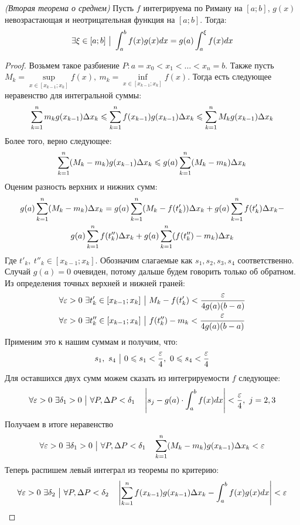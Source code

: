 \begin{theorem} \textit{(Вторая теорема о среднем)}
	Пусть $f$ интегрируема по Риману на $[a;b]$, $g(x)$ невозрастающая и неотрицательная функция на $[a;b]$. Тогда:
	\[
		\exists \xi \in [a;b] \ \big|\  \int_a^bf(x)g(x)dx = g(a)\int_a^\xi f(x)dx
	\]
\end{theorem}


\begin{proof}
	Возьмем такое разбиение $P : a = x_0 < x_1 < \ldots < x_n = b$. Также пусть $M_k = \sup\limits_{x \in [x_{k - 1};x_k]} f(x),\ m_k = \inf\limits_{x \in [x_{k - 1};x_k]} f(x)$. Тогда есть следующее неравенство для интегральной суммы:
	\[
	 	\sum\limits_{k = 1}^nm_kg(x_{k - 1})\Delta x_k \leqslant	\sum\limits_{k = 1}^nf(x_{k - 1})g(x_{k - 1})\Delta x_k \leqslant \sum\limits_{k = 1}^nM_kg(x_{k - 1})\Delta x_k
	\]
	Более того, верно следующее:
	\[
		\sum\limits_{k = 1}^n (M_k - m_k)g(x_{k - 1})\Delta x_k \leqslant g(a) \sum\limits_{k = 1}^n (M_k - m_k) \Delta x_k
	\]
	Оценим разность верхних и нижних сумм:
	\begin{multline*}
		g(a)\sum\limits_{k = 1}^n (M_k - m_k)\Delta x_k = g(a)\sum\limits_{k = 1}^n (M_k - f(t'_k))\Delta x_k + g(a)\sum\limits_{k = 1}^n f(t'_k)\Delta x_k -
		\\
		g(a)\sum\limits_{k = 1}^n f(t''_k)\Delta x_k + g(a)\sum\limits_{k = 1}^n (f(t''_k) - m_k)\Delta x_k
	\end{multline*}
	Где $t'_k,\ t''_k \in [x_{k - 1}; x_k]$.
	Обозначим слагаемые как $s_1, s_2, s_3, s_4$ соответственно. Случай $g(a) = 0$ очевиден, потому дальше будем говорить только об обратном. Из определения точных верхней и нижней граней:
	\begin{align*}
		&{\forall \varepsilon > 0\ \exists t'_k \in [x_{k - 1}; x_k] \ \big|\  M_k - f(t'_k) < \frac{\varepsilon}{4g(a)(b - a)}}
		\\
		&{\forall \varepsilon > 0\ \exists t''_k \in [x_{k - 1}; x_k] \ \big|\  f(t''_k) - m_k < \frac{\varepsilon}{4g(a)(b - a)}}
	\end{align*}
	Применим это к нашим суммам и получим, что:
	\[
		s_1,\ s_4 \such 0 \leq s_1 < \frac{\eps}{4},\ 0 \leq s_4 < \frac{\eps}{4}
	\]
	Для оставшихся двух сумм можем сказать из интегрируемости $f$ следующее:
	\[
		\forall \varepsilon > 0\ \exists \delta_1 > 0 \ \big|\  \forall P, \Delta P < \delta_1 \quad \left|s_j - g(a)\cdot \int_a^bf(x)dx\right| < \frac{\varepsilon}{4},\ j = 2, 3
	\]
	Получаем в итоге неравенство
	\[
		\forall \varepsilon > 0\ \exists \delta_1 > 0 \ \big|\  \forall P, \Delta P < \delta_1 \quad \sum\limits_{k = 1}^n(M_k - m_k)g(x_{k - 1})\Delta x_k < \varepsilon
	\]
	Теперь распишем левый интеграл из теоремы по критерию:
	\[
		\forall \varepsilon > 0\ \exists \delta_2 \ \big|\  \forall P, \Delta P < \delta_2 \quad \left|\sum\limits_{k = 1}^nf(x_{k - 1})g(x_{k - 1}) \Delta x_k - \int_a^bf(x)g(x)dx\right| < \varepsilon
\]
\end{proof}
